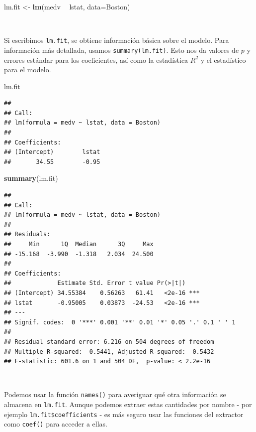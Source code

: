 \documentclass[]{book}
\newenvironment{Shaded}{\begin{snugshade}}{\end{snugshade}}
\newcommand{\KeywordTok}[1]{\textcolor[rgb]{0.13,0.29,0.53}{\textbf{#1}}}
\newcommand{\DataTypeTok}[1]{\textcolor[rgb]{0.13,0.29,0.53}{#1}}
\newcommand{\StringTok}[1]{\textcolor[rgb]{0.31,0.60,0.02}{#1}}
\newcommand{\OperatorTok}[1]{\textcolor[rgb]{0.81,0.36,0.00}{\textbf{#1}}}
\newcommand{\NormalTok}[1]{#1}
\begin{document}
\begin{Shaded}
\begin{Highlighting}[]
\NormalTok{lm.fit <-}\StringTok{ }\KeywordTok{lm}\NormalTok{(medv }\OperatorTok{~}\StringTok{ }\NormalTok{lstat, }\DataTypeTok{data=}\NormalTok{Boston)}
\end{Highlighting}
\end{Shaded}

~

Si escribimos \texttt{lm.fit}, se obtiene información básica sobre el
modelo. Para información más detallada, usamos \texttt{summary(lm.fit)}.
Esto nos da valores de \(p\) y errores estándar para los coeficientes,
así como la estadística \(R^2\) y el estadístico para el modelo.

\begin{Shaded}
\begin{Highlighting}[]
\NormalTok{lm.fit}
\end{Highlighting}
\end{Shaded}

\begin{verbatim}
## 
## Call:
## lm(formula = medv ~ lstat, data = Boston)
## 
## Coefficients:
## (Intercept)        lstat  
##       34.55        -0.95
\end{verbatim}

\begin{Shaded}
\begin{Highlighting}[]
\KeywordTok{summary}\NormalTok{(lm.fit)}
\end{Highlighting}
\end{Shaded}

\begin{verbatim}
## 
## Call:
## lm(formula = medv ~ lstat, data = Boston)
## 
## Residuals:
##     Min      1Q  Median      3Q     Max 
## -15.168  -3.990  -1.318   2.034  24.500 
## 
## Coefficients:
##             Estimate Std. Error t value Pr(>|t|)    
## (Intercept) 34.55384    0.56263   61.41   <2e-16 ***
## lstat       -0.95005    0.03873  -24.53   <2e-16 ***
## ---
## Signif. codes:  0 '***' 0.001 '**' 0.01 '*' 0.05 '.' 0.1 ' ' 1
## 
## Residual standard error: 6.216 on 504 degrees of freedom
## Multiple R-squared:  0.5441, Adjusted R-squared:  0.5432 
## F-statistic: 601.6 on 1 and 504 DF,  p-value: < 2.2e-16
\end{verbatim}

~

Podemos usar la función \texttt{names()} para averiguar qué otra
información se almacena en \texttt{lm.fit}. Aunque podemos extraer estas
cantidades por nombre - por ejemplo \texttt{lm.fit\$coefficients} - es
más seguro usar las funciones del extractor como \texttt{coef()} para
acceder a ellas.
\end{document}
